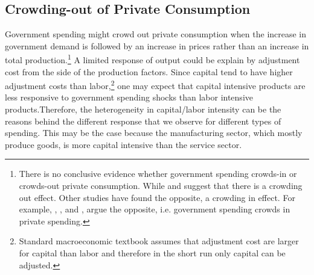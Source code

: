 \documentclass[dv_diss_main.tex]{subfiles}
\begin{document}
\subsection{Crowding-out of Private Consumption}
\label{subsec:crowd}

Government spending might crowd out private consumption when the increase in government demand is followed by an increase in prices rather than an increase in total production.\footnote{There is no conclusive evidence whether government spending crowds-in or crowds-out private consumption. While \cite{Bailey1971} and \cite{Barro1981} suggest that there is a crowding out effect. Other studies have found the opposite, a crowding in effect. For example, \cite{Perotti2005}, \cite{Canzoneri2002}, and \cite{Mountford2009}, argue the opposite, i.e. government spending crowds in private spending.} A limited response of output could be explain by adjustment cost from the side of the production factors. Since capital tend to have higher adjustment costs than labor,\footnote{Standard macroeconomic textbook assumes that adjustment cost are larger for capital than labor and therefore in the short run only capital can be adjusted.} one may expect that capital intensive products are less responsive to government spending shocks than labor intensive products.Therefore, the heterogeneity in capital/labor intensity can be the reasons behind the different response that we observe for different types of spending. This may be the case because the manufacturing sector, which mostly produce goods, is more capital intensive than the service sector.  

\end{document}
